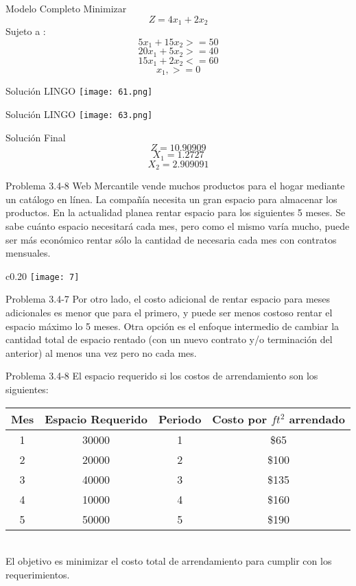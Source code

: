 \documentclass{beamer}
\begin{document}
\begin{frame}[fragile]{Modelo Completo}
Minimizar\\
\[Z = 4x_{1} + 2x_{2}\]
Sujeto a :\\
\[5x_{1} + 15x_{2} >= 50\]
\[20x_{1} +5x_{2} >= 40\]
\[15x_{1} + 2x_{2} <= 60\]
\[x_{1}, >= 0\]
\end{frame}

\begin{frame}[fragile]{Soluci\'on LINGO}
    \texttt{[image: 61.png]}
\end{frame}
\begin{frame}[fragile]{Soluci\'on LINGO}
    \texttt{[image: 63.png]}
\end{frame}

\begin{frame}[fragile]{Soluci\'on Final}
\[Z = 10.90909\]
\[X_{1} = 1.2727\]
\[X_{2} = 2.909091\]
\end{frame}

\begin{frame}[t,fragile]{Problema 3.4-8 }
Web Mercantile vende muchos productos para el hogar mediante un cat\'alogo en l\'inea. La compañ\'ia  necesita un gran espacio para almacenar los productos. En la actualidad planea rentar espacio para los siguientes 5 meses. Se sabe cu\'anto espacio necesitar\'a cada mes, pero como el mismo var\'ia mucho, puede ser m\'as econ\'omico rentar s\'olo la cantidad  de necesaria cada mes con contratos mensuales.
\begin{wrapfigure}{c}{0.20\textwidth}
    \centering
    \texttt{[image: 7]}
\end{wrapfigure}
\end{frame}
\begin{frame}[t,fragile]{Problema 3.4-7}
Por otro lado, el costo adicional de rentar espacio para meses adicionales es menor que para el primero, y puede ser menos costoso rentar el espacio m\'aximo lo 5 meses. Otra opci\'on es el enfoque intermedio de cambiar la cantidad total de  espacio rentado (con un nuevo contrato y/o terminaci\'on del anterior) al menos una vez pero no cada mes.
\end{frame}

\begin{frame}[t,fragile]{Problema 3.4-8 }
El espacio requerido si los costos de arrendamiento son los siguientes:
\begin{tabular}{|c|c|c|c|}
\hline 
Mes & Espacio Requerido & Periodo & Costo por \(ft^2\) arrendado \\ 
\hline 
1 & 30000 & 1 & \$65 \\ 
\hline 
2 & 20000 & 2 & \$100 \\ 
\hline 
3 & 40000 & 3 & \$135 \\ 
\hline 
4 & 10000 & 4 & \$160 \\ 
\hline 
5 & 50000 & 5 & \$190 \\ 
\hline 
\end{tabular} \\
El objetivo es minimizar el costo total de arrendamiento para cumplir con los requerimientos.
\end{frame}
\end{document}
